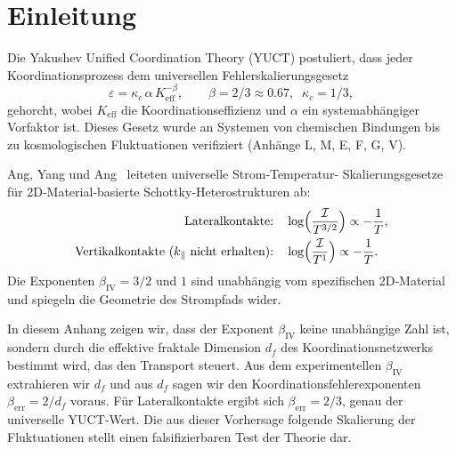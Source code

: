 \documentclass[12pt,a4paper]{article}
\newcommand{\Keff}{K_{\mathrm{eff}}}
\begin{document}
	\tableofcontents
	\newpage
	
	\section{Einleitung}
	Die Yakushev Unified Coordination Theory (YUCT) postuliert, dass jeder
	Koordinationsprozess dem universellen Fehlerskalierungsgesetz
	\begin{equation}
		\varepsilon = \kappa_c \, \alpha \, \Keff^{-\beta},
		\qquad \beta = 2/3 \approx 0.67,\;\; \kappa_c = 1/3,
		\label{eq:yuct-law}
	\end{equation}
	gehorcht, wobei $\Keff$ die Koordinationseffizienz und $\alpha$ ein
	systemabhängiger Vorfaktor ist. Dieses Gesetz wurde an Systemen von
	chemischen Bindungen bis zu kosmologischen Fluktuationen verifiziert
	(Anhänge L, M, E, F, G, V).
	
	Ang, Yang und Ang~\cite{Ang2018} leiteten universelle Strom‑Temperatur‑
	Skalierungsgesetze für 2D‑Material‑basierte Schottky‑Heterostrukturen ab:
	\begin{align}
		\text{Lateralkontakte:}&\quad \log\Bigl(\frac{\mathcal{I}}{T^{3/2}}\Bigr) \propto -\frac{1}{T},
		\label{eq:ang-lat}\\
		\text{Vertikalkontakte ($k_\parallel$ nicht erhalten):}&\quad \log\Bigl(\frac{\mathcal{I}}{T^{1}}\Bigr) \propto -\frac{1}{T}.
		\label{eq:ang-vert}
	\end{align}
	Die Exponenten $\beta_{\mathrm{IV}} = 3/2$ und $1$ sind unabhängig vom
	spezifischen 2D‑Material und spiegeln die Geometrie des Strompfads wider.
	
	In diesem Anhang zeigen wir, dass der Exponent $\beta_{\mathrm{IV}}$
	keine unabhängige Zahl ist, sondern durch die effektive fraktale
	Dimension $d_f$ des Koordinationsnetzwerks bestimmt wird, das den
	Transport steuert. Aus dem experimentellen $\beta_{\mathrm{IV}}$ extrahieren
	wir $d_f$ und aus $d_f$ sagen wir den Koordinationsfehlerexponenten
	$\beta_{\mathrm{err}} = 2/d_f$ voraus. Für Lateralkontakte ergibt sich
	$\beta_{\mathrm{err}} = 2/3$, genau der universelle YUCT‑Wert. Die aus
	dieser Vorhersage folgende Skalierung der Fluktuationen stellt einen
	falsifizierbaren Test der Theorie dar.
	
\end{document}

